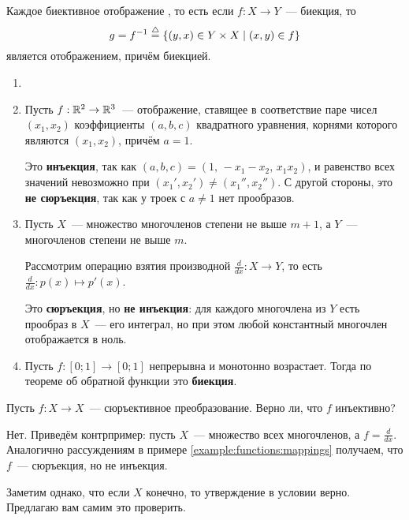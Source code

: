 \begin{corollary}
    Каждое биективное отображение , то есть если $ f: X \to Y $~--- биекция, то
    \[
        g = f^{-1} \overset{\triangle}{=} \{ (y, x) \in Y \times X \mid (x, y) \in f \}
    \]
    является отображением, причём биекцией.
\end{corollary}

\begin{example}
    \label{example:functions:mappings}
    \begin{enumerate}
        \item[]
        \item
            Пусть $ f: \mathbb{R}^2 \to \mathbb{R}^3 $~--- отображение, ставящее в соответствие паре чисел $ (x_1, x_2) $ коэффициенты $ (a, b, c) $
            квадратного уравнения, корнями которого являются $ (x_1, x_2) $, причём $ a = 1 $.

            Это \textbf{инъекция}, так как $ (a, b, c) = (1, \, - x_1 - x_2, \, x_1 x_2) $, и равенство всех значений невозможно при $ (x_1', x_2') \neq (x_1'', x_2'') $.
            С другой стороны, это \textbf{не сюръекция}, так как у троек с $ a \neq 1 $ нет прообразов.
        \item
            Пусть $ X $~--- множество многочленов степени не выше $ m+1 $, а $ Y $~--- многочленов степени не выше $ m $.

            Рассмотрим операцию взятия производной $ \frac{d}{dx}: X \to Y $, то есть $ \frac{d}{dx}: p(x) \mapsto p'(x) $.

            Это \textbf{сюръекция}, но \textbf{не инъекция}: для каждого многочлена из $ Y $ есть прообраз в $ X $~--- его интеграл, но при этом любой константный многочлен отображается в ноль.
        \item
            Пусть $ f: [0;1] \to [0;1] $ непрерывна и монотонно возрастает.
            Тогда по теореме об обратной функции это \textbf{биекция}.
    \end{enumerate}
\end{example}

\begin{Exercise}[counter=SecExercise]
    \noindent
    Пусть $ f: X \to X $~--- сюръективное преобразование.
    Верно ли, что $ f $ инъективно?
\end{Exercise}

\begin{Answer}
    \noindent
    Нет.
    Приведём контрпример: пусть $ X $~--- множество всех многочленов, а $ f = \frac{d}{dx} $.
    Аналогично рассуждениям в примере \ref{example:functions:mappings} получаем, что $ f $~--- сюръекция, но не инъекция.

    Заметим однако, что если $ X $ конечно, то утверждение в условии верно.
    Предлагаю вам самим это проверить.
\end{Answer}

